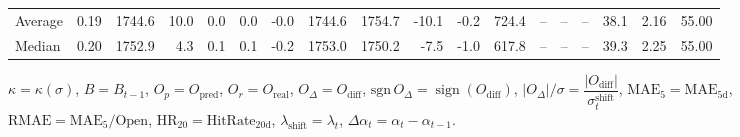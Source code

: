 \begin{threeparttable}
{\begin{tabular}{lrrrrrrrrrrrrrrrrr}
Average &     0.19 & 1744.6 &              10.0 &               0.0 &                0.0 &               -0.0 & 1744.6 & 1754.7 &      -10.1 &                     -0.2 &               724.4 &         -- &        -- &             -- &             38.1 &            2.16 &                  55.00 \\
 Median &     0.20 & 1752.9 &               4.3 &               0.1 &                0.1 &               -0.2 & 1753.0 & 1750.2 &       -7.5 &                     -1.0 &               617.8 &         -- &        -- &             -- &             39.3 &            2.25 &                  55.00 \\
\bottomrule
\end{tabular}
}
\begin{tablenotes}\footnotesize
\item $\kappa=\kappa(\sigma)$, $B=B_{t-1}$, $O_p=O_{\text{pred}}$, $O_r=O_{\text{real}}$, $O_\Delta=O_{\text{diff}}$, $\mathrm{sgn}\,O_\Delta=\operatorname{sign}(O_{\text{diff}})$, $|O_\Delta|/\sigma=\dfrac{|O_{\text{diff}}|}{\sigma_t^{\text{shift}}}$, $\mathrm{MAE}_5=\mathrm{MAE}_{5\text{d}}$, $\mathrm{RMAE}= \mathrm{MAE}_5 / \text{Open}$, $\mathrm{HR}_{20}=\mathrm{HitRate}_{20\text{d}}$, 
$\lambda_{\text{shift}}=\lambda_t$, 
$\Delta\alpha_t=\alpha_t-\alpha_{t-1}$.
\end{tablenotes}
\end{threeparttable}
\endgroup

